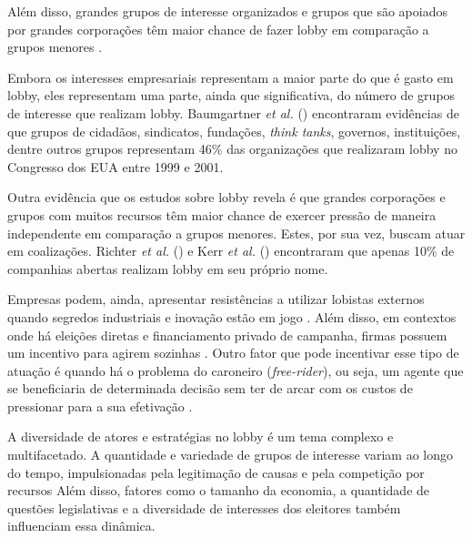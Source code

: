 Além disso, grandes grupos de interesse organizados e grupos que são apoiados por grandes corporações têm maior chance de fazer lobby em comparação a grupos menores \cite{de_figueiredo_advancing_2014}. 

Embora os interesses empresariais representam a maior parte do que é gasto em lobby, eles representam uma parte, ainda que significativa, do número de grupos de interesse que realizam lobby. Baumgartner \textit{et al.} (\citeyear{baumgartner2009lobbying}) encontraram evidências de que grupos de cidadãos, sindicatos, fundações, \textit{think tanks}, governos, instituições, dentre outros grupos representam 46\% das organizações que realizaram lobby no Congresso dos EUA entre 1999 e 2001.

Outra evidência que os estudos sobre lobby revela é que grandes corporações e grupos com muitos recursos têm maior chance de exercer pressão de maneira independente em comparação a grupos menores. Estes, por sua vez, buscam atuar em coalizações. Richter \textit{et al.} (\citeyear{richter2011good}) e Kerr \textit{et al.} (\citeyear{kerr2014dynamics}) encontraram que apenas 10\% de companhias abertas realizam lobby em seu próprio nome.

Empresas podem, ainda, apresentar resistências a utilizar lobistas externos quando segredos industriais e inovação estão em jogo \cite{de2001structure}. Além disso, em contextos onde há eleições diretas e financiamento privado de campanha, firmas possuem um incentivo para agirem sozinhas \cite{mahoney_lobbying_2007}. Outro fator que pode incentivar esse tipo de atuação é quando há o problema do caroneiro (\textit{free-rider}), ou seja, um agente que se beneficiaria de determinada decisão sem ter de arcar com os custos de pressionar para a sua efetivação \cite{bombardini2012competition}.

A diversidade de atores e estratégias no lobby é um tema complexo e multifacetado. A quantidade e variedade de grupos de interesse variam ao longo do tempo, impulsionadas pela legitimação de causas e pela competição por recursos \cite{lowery2007organized} Além disso, fatores como o tamanho da economia, a quantidade de questões legislativas \cite{baumgartner2009lobbying, lowery_lobbying_2013} e a diversidade de interesses dos eleitores \cite{berkman2001legislative} também influenciam essa dinâmica.


